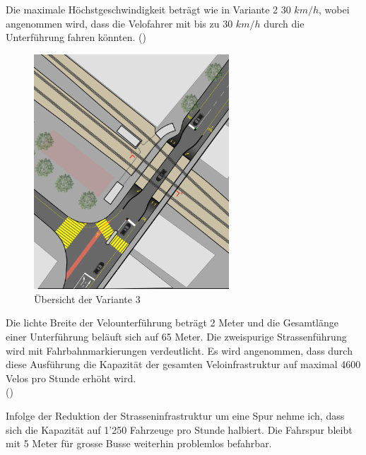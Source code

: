 Die maximale Höchstgeschwindigkeit beträgt wie in Variante 2 30 $km/h$, wobei angenommen wird, dass die Velofahrer mit bis zu 30 $km/h$ durch die Unterführung fahren könnten. (\cite{Mikrozensus2015})


\begin{figure}[h!]
	\centering
	\includegraphics[width=0.65\textwidth]{figures/f-04-05-03-a-V3}
	\caption[Übersicht Variante 3]{Übersicht der Variante 3}
	\label{img:V3Ü}
\end{figure}

Die lichte Breite der Velounterführung beträgt 2 Meter und die Gesamtlänge einer Unterführung beläuft sich auf 65 Meter. Die zweispurige Strassenführung wird mit Fahrbahnmarkierungen verdeutlicht. Es wird angenommen, dass durch diese Ausführung die Kapazität der gesamten Veloinfrastruktur auf maximal 4600 Velos pro Stunde erhöht wird. \\(\cite{Nacto2018})

Infolge der Reduktion der Strasseninfrastruktur um eine Spur nehme ich, dass sich die Kapazität auf 1'250 Fahrzeuge pro Stunde halbiert. Die Fahrspur bleibt mit 5 Meter für grosse Busse weiterhin problemlos befahrbar.

